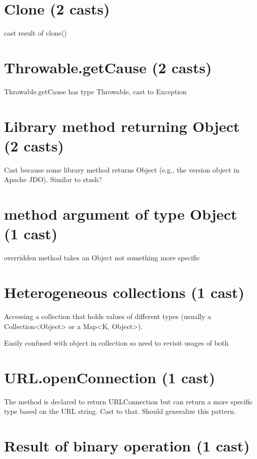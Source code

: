 \documentclass{usiinfdocprop}
\begin{document}
\section{Clone (2 casts)}
\label{sec:org8983638}

cast result of clone() 

\section{Throwable.getCause (2 casts)}
\label{sec:org2605b45}

Throwable.getCause has type Throwable, cast to Exception 

\section{Library method returning Object (2 casts)}
\label{sec:orgf68c828}

Cast because some library method returns Object (e.g., the version object in Apache JDO). 
Similar to stash? 

\section{method argument of type Object (1 cast)}
\label{sec:org888d43c}

overridden method takes an Object not something more specific 

\section{Heterogeneous collections (1 cast)}
\label{sec:orga4b2a0d}

Accessing a collection that holds values of different types (usually a Collection<Object> or a Map<K, Object>). 

Easily confused with object in collection so need to revisit usages of both 

\section{URL.openConnection (1 cast)}
\label{sec:orgdc3f871}

The method is declared to return URLConnection but can return a more specific type based on the URL string. 
Cast to that. 
Should generalize this pattern. 

\section{Result of binary operation (1 cast)}
\label{sec:orgf0797dd}
\end{document}
